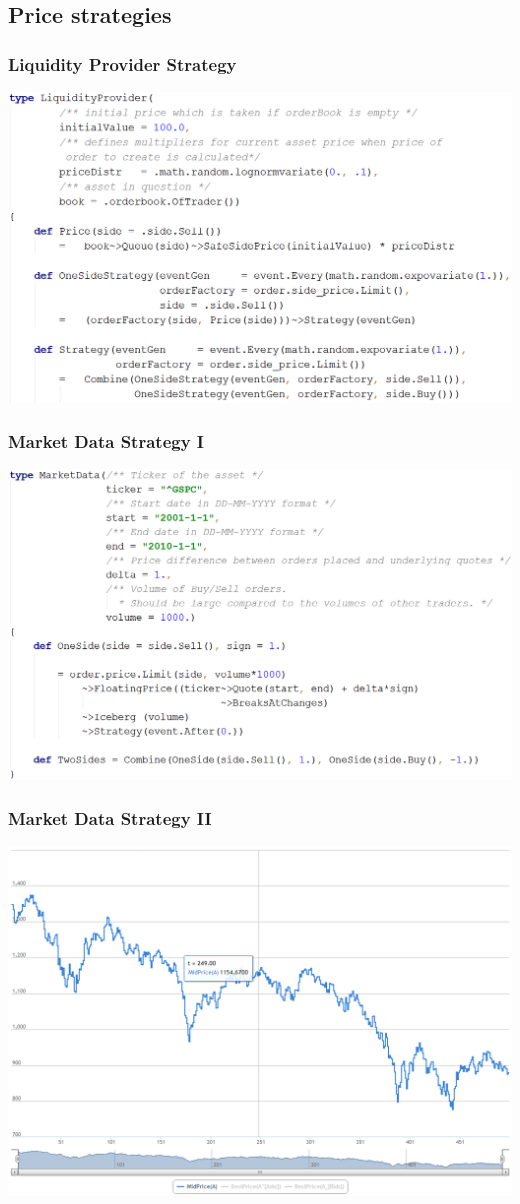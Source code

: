 \documentclass{beamer}
\begin{document}
\subsection{Price strategies}
\begin{frame}
\frametitle{Liquidity Provider Strategy}
\includegraphics[width=1\linewidth]{lp_strategy.png}
\end{frame}
\begin{frame}
\frametitle{Market Data Strategy I}
\includegraphics[width=1\linewidth]{marketdata_strategy.png}
\end{frame}
\begin{frame}
\frametitle{Market Data Strategy II}
\includegraphics[width=1\linewidth]{marketdata.png}
\end{frame}
\end{document}
